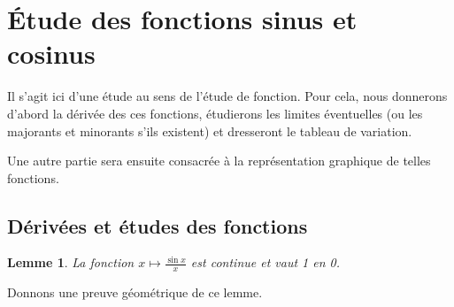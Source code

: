 \documentclass[11pt,a4paper,french]{article}
\theoremstyle{break}
\newtheorem{lemme}{Lemme}
\theoremstyle{plain}
\theoremstyle{nonumberplain}
\theoremstyle{nonumberbreak}
\begin{document}
\section{Étude des fonctions sinus et cosinus}

Il s'agit ici d'une étude au sens de l'étude de fonction. Pour cela,
nous donnerons d'abord la dérivée des ces fonctions, étudierons les
limites éventuelles (ou les majorants et minorants s'ils existent) et
dresseront le tableau de variation.

Une autre partie sera ensuite consacrée à la représentation graphique de
telles fonctions.

\subsection{Dérivées et études des fonctions}

\begin{lemme}
  La fonction $x \mapsto \frac{\sin x}{x}$ est continue et vaut 1 en 0.
\end{lemme}

Donnons une preuve géométrique de ce lemme.
\end{document}
